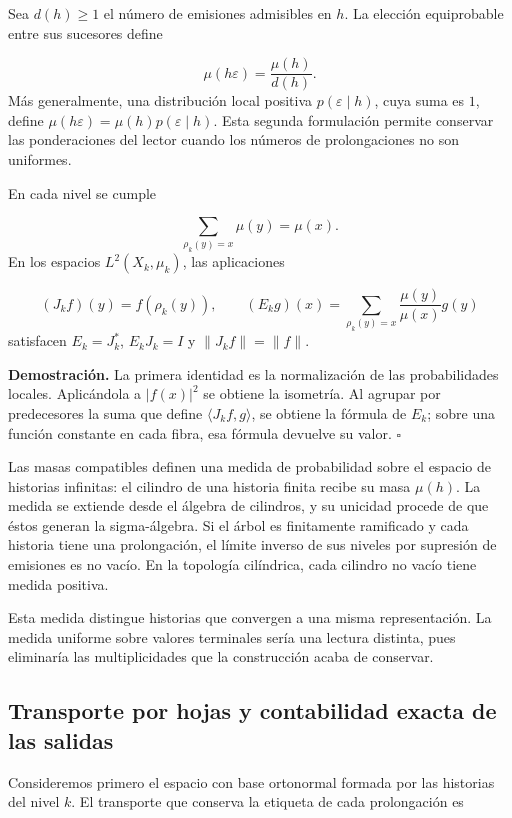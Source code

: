 Sea \(d(h)\geq1\) el número de emisiones admisibles en \(h\). La elección equiprobable entre sus sucesores define

\[
\mu(h\varepsilon)=\frac{\mu(h)}{d(h)}.
\]
Más generalmente, una distribución local positiva \(p(\varepsilon\mid h)\), cuya suma es \(1\), define \(\mu(h\varepsilon)=\mu(h)p(\varepsilon\mid h)\). Esta segunda formulación permite conservar las ponderaciones del lector cuando los números de prolongaciones no son uniformes.

En cada nivel se cumple

\[
\sum_{\rho_k(y)=x}\mu(y)=\mu(x).
\]
En los espacios \(L^2(X_k,\mu_k)\), las aplicaciones

\[
(J_kf)(y)=f(\rho_k(y)),
\qquad
(E_kg)(x)=\sum_{\rho_k(y)=x}\frac{\mu(y)}{\mu(x)}g(y)
\]
satisfacen \(E_k=J_k^*\), \(E_kJ_k=I\) y \(\|J_kf\|=\|f\|\).

\textbf{Demostración.} La primera identidad es la normalización de las probabilidades locales. Aplicándola a \(|f(x)|^2\) se obtiene la isometría. Al agrupar por predecesores la suma que define \(\langle J_kf,g\rangle\), se obtiene la fórmula de \(E_k\); sobre una función constante en cada fibra, esa fórmula devuelve su valor. \hfill\(\square\)

Las masas compatibles definen una medida de probabilidad sobre el espacio de historias infinitas: el cilindro de una historia finita recibe su masa \(\mu(h)\). La medida se extiende desde el álgebra de cilindros, y su unicidad procede de que éstos generan la sigma-álgebra. Si el árbol es finitamente ramificado y cada historia tiene una prolongación, el límite inverso de sus niveles por supresión de emisiones es no vacío. En la topología cilíndrica, cada cilindro no vacío tiene medida positiva.

Esta medida distingue historias que convergen a una misma representación. La medida uniforme sobre valores terminales sería una lectura distinta, pues eliminaría las multiplicidades que la construcción acaba de conservar.

\subsection{Transporte por hojas y contabilidad exacta de las salidas}
Consideremos primero el espacio con base ortonormal formada por las historias del nivel \(k\). El transporte que conserva la etiqueta de cada prolongación es

